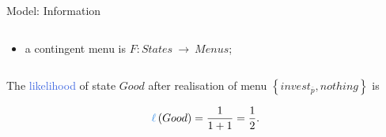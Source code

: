 \documentclass[usenames,dvipsnames,aspectratio=169,11pt]{beamer}
\begin{document}
\begin{frame}[noframenumbering]{Model: Information}
\begin{columns}
		\begin{column}{0.45\textwidth} %
			\begin{itemize}
				\item a contingent menu is \(F: States \: \rightarrow \: Menus \);
			\end{itemize}
		\end{column}
	\end{columns}

	\vspace{0.6cm}

	The \textcolor{RoyalBlue}{likelihood} of state \(Good\) after realisation of menu \( \left\{invest_{\overline{p}}, nothing \right\} \) is

	\vfill

	\[ \textcolor{RoyalBlue}{\ell} \left( Good \right) = \frac{1}{1+1} = \frac{1}{2} .
	\]

\end{frame}
\end{document}
